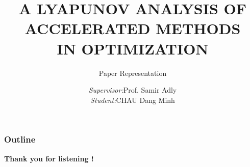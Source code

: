 \documentclass[xcolor=dvipsnames, aspectratio=169, 10pt]{beamer}
\title[]{A LYAPUNOV ANALYSIS OF ACCELERATED METHODS \\ IN OPTIMIZATION}
\subtitle{Paper Representation}
\author[Minh]{
		\begin{tabular}{lll}
			\textit{\small Supervisor:} & \small Prof. Samir Adly \\
			\textit{\small Student:} & \small CHAU Dang Minh
            \vspace{.5cm}\\
		\end{tabular}
	}
\institute[Limoges]{
	{
		University of Limoges
	}
}
\begin{document}
\date{}
\begin{frame}
	\titlepage
\end{frame}

\begin{frame}
	\frametitle{Outline}
	\tableofcontents
\end{frame}





\begin{frame}{}
	\begin{center}
		\Huge\textbf{Thank you for listening !}
	\end{center}
\end{frame}
\end{document}
